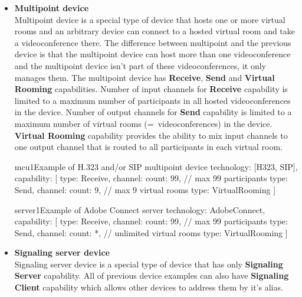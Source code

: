 \begin{itemize}
\begin{TopologyExample}{terminal4}
      {Example of terminal with one virtual room 
for H.323 and/or SIP}
technology: [H323, SIP],
capability: [
  {type: Receive, channel: {count: 9}}, // max 9 other participants
  {type: Send, channel: {count: 1}},
  {type: Mix}
]
\end{TopologyExample}

\item \textbf{Multipoint device} \\
  Multipoint device is a special type of device that hosts one or more virtual 
  rooms and an arbitrary device can connect to a hosted virtual room and take 
  a videoconference there. The difference between multipoint and the previous 
  device is that the multipoint device can host more than one videoconference 
  and the multipoint device isn't part of these videoconferences, it only 
  manages them. The multipoint device has \textbf{Receive}, \textbf{Send}
  and \textbf{Virtual Rooming} capabilities. Number of input 
  channels for \textbf{Receive} capability is limited to a maximum number of 
  participants in all hosted videoconferences in the device. Number of output 
  channels for \textbf{Send} capability is limited to a maximum number of 
  virtual rooms (=~videoconferences) in the device. \textbf{Virtual Rooming} 
  capability provides the ability to mix input channels to one output channel 
  that is routed to all participants in each virtual room.

\begin{TopologyExample}{mcu1}{Example of H.323 and/or SIP multipoint device}
technology: [H323, SIP],
capability: [
  {type: Receive, channel: {count: 99}}, // max 99 participants
  {type: Send, channel: {count: 9}},     // max 9 virtual rooms
  {type: VirtualRooming}
]
\end{TopologyExample}

\begin{TopologyExample}{server1}{Example of Adobe Connect server}
technology: AdobeConnect,
capability: [
  {type: Receive, channel: {count: 99}}, // max 99 participants
  {type: Send, channel: {count: *}},     // unlimited virtual rooms
  {type: VirtualRooming}
]
\end{TopologyExample}

\item \textbf{Signaling server device} \\
  Signaling server device is a special type of device that has only 
  \textbf{Signaling Server} capability. All of previous device examples can 
  also have \textbf{Signaling Client} capability which allows other devices
  to address them by it's alias.
    

\end{itemize}
